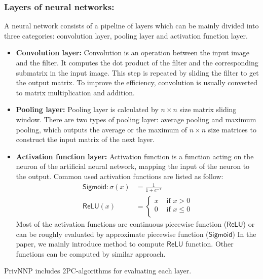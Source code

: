 \documentclass[letterpaper]{article} %
\begin{document}
    \subsubsection{Layers of neural networks:}
    A neural network consists of a pipeline of layers which can be mainly divided into three categories:
    convolution layer, pooling layer and activation function layer.
    \begin{itemize}
        \item \textbf{Convolution layer:}
        Convolution is an operation between the input image and the filter.
        It computes the dot product of the filter and the corresponding submatrix in the input image.
        This step is repeated by sliding the filter to get the output matrix.
        To improve the efficiency, convolution is usually converted to matrix multiplication and addition.

        \item \textbf{Pooling layer:}
        Pooling layer is calculated by $n\times n$ size matrix sliding window.
        There are two types of pooling layer: average pooling and maximum pooling,
        which outputs the average or the maximum of $n\times n$ size matrices to construct the input matrix of the next layer.

        \item \textbf{Activation function layer:}
        Activation function is a function acting on the neuron of the artificial neural network,
        mapping the input of the neuron to the output.
        Common used activation functions are listed as follow:
        \begin{align*}
        \mathsf{Sigmoid}: \sigma(x) &=\frac{1}{1+e^{-x}}\\
        \mathsf{ReLU}(x)&=\begin{cases}
            x & \text{ if } x > 0 \\
            0 & \text{ if } x \leqslant 0 \\
            \end{cases}
        \end{align*}
        Most of the activation functions are continuous piecewise function ($\mathsf{ReLU}$)
        or can be roughly evaluated by approximate piecewise function ($\mathsf{Sigmoid}$)
        In the paper, we mainly introduce method to compute $\mathsf{ReLU}$ function.
        Other functions can be computed by similar approach.
    \end{itemize}
    PrivNNP includes 2PC-algorithms for evaluating each layer.
\end{document}
